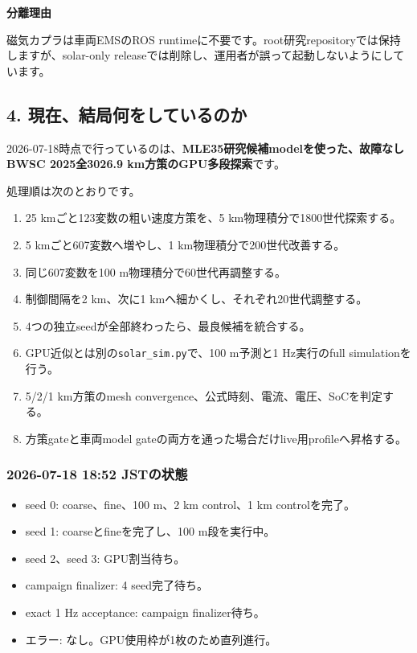 \documentclass[
  japanese,
  a4paper,
  11pt]{article}
\providecommand{\tightlist}{%
  \setlength{\itemsep}{0pt}\setlength{\parskip}{0pt}}
\begin{document}
\textbf{分離理由}

磁気カプラは車両EMSのROS
runtimeに不要です。root研究repositoryでは保持しますが、solar-only
releaseでは削除し、運用者が誤って起動しないようにしています。

\subsection{4.
現在、結局何をしているのか}\label{4-ux73feux5728ux7d50ux5c40ux4f55ux3092ux3057ux3066ux3044ux308bux306eux304b}

2026-07-18時点で行っているのは、\textbf{MLE35研究候補modelを使った、故障なしBWSC
2025全3026.9 km方策のGPU多段探索}です。

処理順は次のとおりです。

\begin{enumerate}
\def\labelenumi{\arabic{enumi}.}
\tightlist
\item
  25 kmごと123変数の粗い速度方策を、5 km物理積分で1800世代探索する。
\item
  5 kmごと607変数へ増やし、1 km物理積分で200世代改善する。
\item
  同じ607変数を100 m物理積分で60世代再調整する。
\item
  制御間隔を2 km、次に1 kmへ細かくし、それぞれ20世代調整する。
\item
  4つの独立seedが全部終わったら、最良候補を統合する。
\item
  GPU近似とは別の\texttt{solar\_sim.py}で、100 m予測と1 Hz実行のfull
  simulationを行う。
\item
  5/2/1 km方策のmesh convergence、公式時刻、電流、電圧、SoCを判定する。
\item
  方策gateと車両model
  gateの両方を通った場合だけlive用profileへ昇格する。
\end{enumerate}

\subsubsection{2026-07-18 18:52
JSTの状態}\label{2026-07-18-1852-jstux306eux72b6ux614b}

\begin{itemize}
\tightlist
\item
  seed 0: coarse、fine、100 m、2 km control、1 km controlを完了。
\item
  seed 1: coarseとfineを完了し、100 m段を実行中。
\item
  seed 2、seed 3: GPU割当待ち。
\item
  campaign finalizer: 4 seed完了待ち。
\item
  exact 1 Hz acceptance: campaign finalizer待ち。
\item
  エラー: なし。GPU使用枠が1枚のため直列進行。
\end{itemize}
\end{document}
